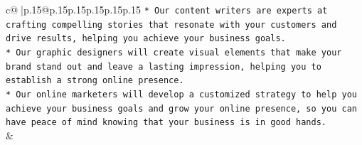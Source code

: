 \documentclass{article}
\begin{document}
{\begin{supertabular}{c@{$\;$}|p{.15\linewidth}@{}p{.15\linewidth}p{.15\linewidth}p{.15\linewidth}p{.15\linewidth}p{.15\linewidth}}
{{{\texttt{* Our content writers are experts at crafting compelling stories that resonate with your customers and drive results, helping you achieve your business goals.} \\
\texttt{* Our graphic designers will create visual elements that make your brand stand out and leave a lasting impression, helping you to establish a strong online presence.} \\
\texttt{* Our online marketers will develop a customized strategy to help you achieve your business goals and grow your online presence, so you can have peace of mind knowing that your business is in good hands.} \\
            }
        }
    }
    & \\ \\

\end{supertabular}
}
\end{document}

